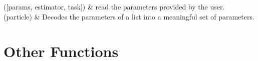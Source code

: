 \documentclass[letterpaper,10pt,english]{sphinxmanual}
\begin{document}
\begin{savenotes}\sphinxatlongtablestart\begin{longtable}[c]{}
\hline

\endfirsthead

%
{}\\
\hline

\endhead

\hline
{}\\
\endfoot

\endlastfoot

{\hyperref[\detokenize{index:pspso.pspso.readparameters}]{}}({[}params, estimator, task{]})
&
read the parameters provided by the user.
\\
\hline
{\hyperref[\detokenize{index:pspso.pspso.decode_parameters}]{}}(particle)
&
Decodes the parameters of a list into a meaningful set of parameters.
\\
\hline
\end{longtable}\sphinxatlongtableend\end{savenotes}


\section{Other Functions}
\label{\detokenize{index:other-functions}}
\end{document}
